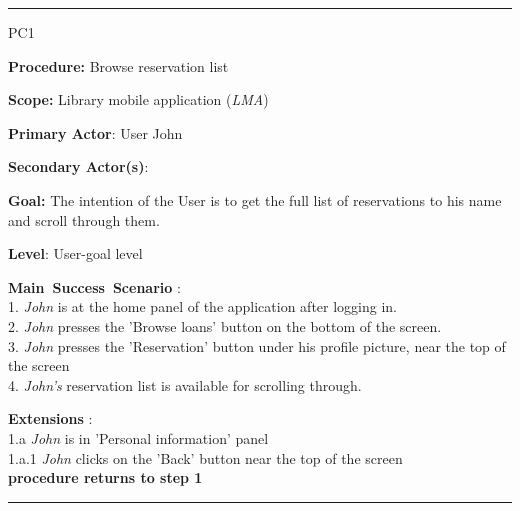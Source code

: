 \vspace{0.5cm}
\hrule
\begin{lyxlist}{PC1}
\small{
\item [\textbf{Procedure:}] Browse reservation list
\item [\textbf{Scope:}] Library mobile application (\emph{LMA})
\item [\textbf{Primary Actor}:] User John
\item [\textbf{Secondary Actor(s)}:] 
\item [\textbf{Goal:}] The intention of the User is to get the full list of
reservations to his name and scroll through them.
\item [\textbf{Level}:] User-goal level
\item [\textbf{Main~Success~Scenario}]:\\
1. \emph{John} is at the home panel of the application after logging in.\\
2. \emph{John} presses the 'Browse loans' button on the bottom of the screen.\\
3. \emph{John} presses the 'Reservation' button under his profile picture, near
the top of the screen\\
4. \emph{John's} reservation list is available for scrolling
through.\\

\item [\textbf{Extensions}]:\\
1.a \emph{John} is in 'Personal information' panel\\
\hspace*{0.5cm} 1.a.1 \emph{John} clicks on the 'Back' button near the top of
the screen\\
\hspace*{0.5cm} \textbf{procedure returns to step 1}

}

\end{lyxlist}
\hrule


